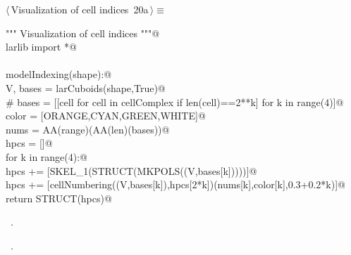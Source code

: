 \documentclass[11pt,oneside]{article}    %
\begin{document}
\begin{flushleft} \small \label{scrap32}
\protect{}$\langle\,$Visualization of cell indices\nobreak\ {\footnotesize 20a}$\,\rangle\equiv$
\vspace{-1ex}
\begin{list}{}{} \item
\mbox{}\verb@""" Visualization of cell indices """@\\
\mbox{}\verb@from larlib import *@\\
\mbox{}\verb@@\\
\mbox{}\verb@def modelIndexing(shape):@\\
\mbox{}\verb@    V, bases = larCuboids(shape,True)@\\
\mbox{}\verb@    # bases = [[cell for cell in cellComplex if len(cell)==2**k] for k in range(4)]@\\
\mbox{}\verb@    color = [ORANGE,CYAN,GREEN,WHITE]@\\
\mbox{}\verb@    nums = AA(range)(AA(len)(bases))@\\
\mbox{}\verb@    hpcs = []@\\
\mbox{}\verb@    for k in range(4):@\\
\mbox{}\verb@        hpcs += [SKEL_1(STRUCT(MKPOLS((V,bases[k]))))]@\\
\mbox{}\verb@        hpcs += [cellNumbering((V,bases[k]),hpcs[2*k])(nums[k],color[k],0.3+0.2*k)]@\\
\mbox{}\verb@    return STRUCT(hpcs)@\\
\mbox{}\verb@@{\NWsep}
\end{list}
\vspace{-1ex}
\footnotesize\addtolength{\baselineskip}{-1ex}
\begin{list}{}{\setlength{\itemsep}{-\parsep}\setlength{\itemindent}{-\leftmargin}}
\item \NWtxtMacroDefBy\ .
\item \NWtxtMacroRefIn\ .
\end{list}
\end{flushleft}
\end{document}
